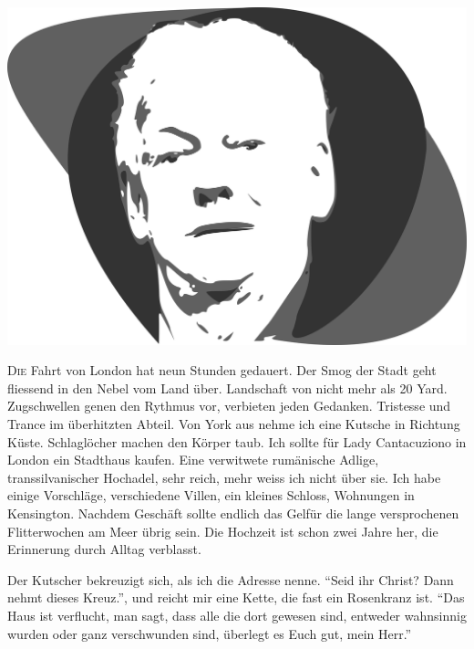 ﻿\thispagestyle{empty}
\begin{center}
\includegraphics[width=\textwidth]{./bilder/wheterby.png}
\end{center}
\vspace*{\fill}
{\centering\fontsize{50}{48} \color{farbe}\par}
\newpage
\lettrine[lines=3, lhang=.2, loversize=.25, lraise=0.05, findent=0.1em,
nindent=0em]{D}{ie} Fahrt von London hat neun Stunden gedauert. Der Smog der Stadt geht fliessend in den Nebel vom Land über. Landschaft von nicht mehr als 20 Yard. Zugschwellen genen den Rythmus vor, verbieten jeden Gedanken. Tristesse und Trance im überhitzten Abteil. Von York aus nehme ich eine Kutsche in Richtung Küste. Schlaglöcher machen den Körper taub. Ich sollte für Lady Cantacuziono in London ein Stadthaus kaufen. Eine verwitwete rumänische Adlige, transsilvanischer Hochadel, sehr reich, mehr weiss ich nicht über sie. Ich habe einige Vorschläge, verschiedene Villen, ein kleines Schloss, Wohnungen in Kensington. Nachdem Geschäft sollte endlich das Gelfür die lange versprochenen Flitterwochen am Meer übrig sein. Die Hochzeit ist schon zwei Jahre her, die Erinnerung durch Alltag verblasst.

Der Kutscher bekreuzigt sich, als ich die Adresse nenne. \enquote{Seid ihr Christ? Dann nehmt dieses Kreuz.}, und reicht mir eine Kette, die fast ein Rosenkranz ist. \enquote{Das Haus ist verflucht, man sagt, dass alle die dort gewesen sind, entweder wahnsinnig wurden oder ganz verschwunden sind, überlegt es Euch gut, mein Herr.} 

